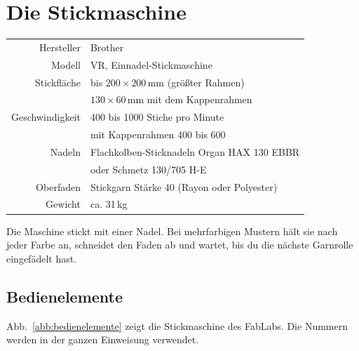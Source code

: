 \documentclass{\basedir/fablab-document}
\begin{document}
	\newpage

	\renewcommand{\contentsname}{Inhaltsverzeichnis / Arbeitsablauf}
	\setcounter{tocdepth}{2}
	\tableofcontents
	\newpage

	\section{Die Stickmaschine}

	\begin{center}
		\begin{tabular}{r|l}
			Hersteller & Brother \\
			Modell & VR, Einnadel-Stickmaschine \\
			Stickfläche & bis $200 \times 200$\,mm (größter Rahmen) \\
			 & $130 \times 60$\,mm mit dem Kappenrahmen \\
			Geschwindigkeit & 400 bis 1000 Stiche pro Minute \\
			 & mit Kappenrahmen 400 bis 600 \\
			Nadeln & Flachkolben-Sticknadeln Organ HAX 130 EBBR \\
			 & oder Schmetz 130/705 H-E \\
			Oberfaden & Stickgarn Stärke 40 (Rayon oder Polyester) \\
			Gewicht & ca. 31\,kg \\
		\end{tabular}
	\end{center}

	Die Maschine stickt mit einer Nadel. Bei mehrfarbigen Mustern hält sie nach jeder Farbe an, schneidet den Faden ab und wartet, bis du die nächste Garnrolle eingefädelt hast.

	\subsection{Bedienelemente}
	\label{sec:bedienelemente}

	Abb.~\ref{abb:bedienelemente} zeigt die Stickmaschine des FabLabs. Die Nummern werden in der ganzen Einweisung verwendet.

	\begin{center}
		
		\label{abb:bedienelemente}
	\end{center}
\end{document}
